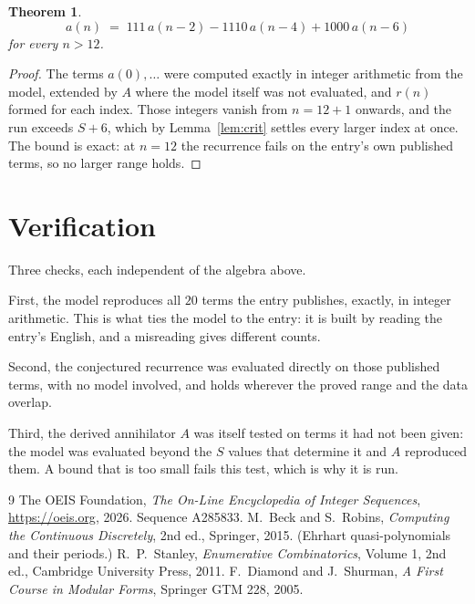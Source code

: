\documentclass[11pt,a4paper]{article}
\theoremstyle{plain}
\newtheorem{theorem}{Theorem}
\theoremstyle{definition}
\begin{document}
\begin{theorem}
\[
a(n)\;=\;111\,a(n-2) - 1110\,a(n-4) + 1000\,a(n-6)
\]
for every $n>12$.
\end{theorem}

\begin{proof}
The terms $a(0),\dots$ were computed exactly in integer arithmetic from the model, extended by
$A$ where the model itself was not evaluated, and $r(n)$ formed for each index. Those integers
vanish from $n=12+1$ onwards, and the run exceeds $S+6$, which by
Lemma~\ref{lem:crit} settles every larger index at once. The bound is exact: at $n=12$ the recurrence fails on the entry's own published terms, so no larger range holds.
\end{proof}

\section{Verification}

Three checks, each independent of the algebra above.

First, the model reproduces all $20$ terms the entry publishes, exactly, in integer
arithmetic. This is what ties the model to the entry: it is built by reading the entry's
English, and a misreading gives different counts.

Second, the conjectured recurrence was evaluated directly on those published terms, with no
model involved, and holds wherever the proved range and the data overlap.

Third, the derived annihilator $A$ was itself tested on terms it had not been given: the model
was evaluated beyond the $S$ values that determine it and $A$ reproduced them. A bound that is
too small fails this test, which is why it is run.

\begin{thebibliography}{9}
 The OEIS Foundation, \emph{The On-Line Encyclopedia of Integer
Sequences}, \url{https://oeis.org}, 2026. Sequence A285833.
 M.~Beck and S.~Robins, \emph{Computing the Continuous Discretely},
2nd ed., Springer, 2015. (Ehrhart quasi-polynomials and their periods.)
 R.~P.~Stanley, \emph{Enumerative Combinatorics}, Volume 1, 2nd ed.,
Cambridge University Press, 2011.
 F.~Diamond and J.~Shurman, \emph{A First Course in Modular Forms},
Springer GTM 228, 2005.
\end{thebibliography}
\end{document}
